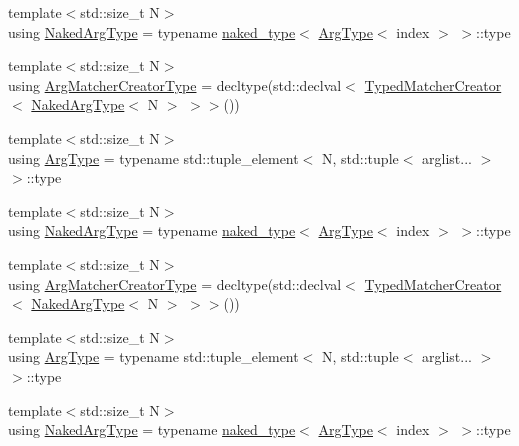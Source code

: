 \begin{DoxyCompactItemize}
\item 
{\footnotesize template$<$std\+::size\+\_\+t N$>$ }\\using \mbox{\hyperlink{classfakeit_1_1MatchersCollector_aeda8ced6a2f0cb7c6e4f916f18a91730}{Naked\+Arg\+Type}} = typename \mbox{\hyperlink{structfakeit_1_1naked__type}{naked\+\_\+type}}$<$ \mbox{\hyperlink{classfakeit_1_1MatchersCollector_aaba0fca8c182a698dda8ca056c29fe5f}{Arg\+Type}}$<$ index $>$ $>$\+::type
\item 
{\footnotesize template$<$std\+::size\+\_\+t N$>$ }\\using \mbox{\hyperlink{classfakeit_1_1MatchersCollector_a1b9d32a66882e0559e7072f1db88eee3}{Arg\+Matcher\+Creator\+Type}} = decltype(std\+::declval$<$ \mbox{\hyperlink{structfakeit_1_1TypedMatcherCreator}{Typed\+Matcher\+Creator}}$<$ \mbox{\hyperlink{classfakeit_1_1MatchersCollector_aeda8ced6a2f0cb7c6e4f916f18a91730}{Naked\+Arg\+Type}}$<$ N $>$ $>$$>$())
\item 
{\footnotesize template$<$std\+::size\+\_\+t N$>$ }\\using \mbox{\hyperlink{classfakeit_1_1MatchersCollector_aaba0fca8c182a698dda8ca056c29fe5f}{Arg\+Type}} = typename std\+::tuple\+\_\+element$<$ N, std\+::tuple$<$ arglist... $>$ $>$\+::type
\item 
{\footnotesize template$<$std\+::size\+\_\+t N$>$ }\\using \mbox{\hyperlink{classfakeit_1_1MatchersCollector_aeda8ced6a2f0cb7c6e4f916f18a91730}{Naked\+Arg\+Type}} = typename \mbox{\hyperlink{structfakeit_1_1naked__type}{naked\+\_\+type}}$<$ \mbox{\hyperlink{classfakeit_1_1MatchersCollector_aaba0fca8c182a698dda8ca056c29fe5f}{Arg\+Type}}$<$ index $>$ $>$\+::type
\item 
{\footnotesize template$<$std\+::size\+\_\+t N$>$ }\\using \mbox{\hyperlink{classfakeit_1_1MatchersCollector_a1b9d32a66882e0559e7072f1db88eee3}{Arg\+Matcher\+Creator\+Type}} = decltype(std\+::declval$<$ \mbox{\hyperlink{structfakeit_1_1TypedMatcherCreator}{Typed\+Matcher\+Creator}}$<$ \mbox{\hyperlink{classfakeit_1_1MatchersCollector_aeda8ced6a2f0cb7c6e4f916f18a91730}{Naked\+Arg\+Type}}$<$ N $>$ $>$$>$())
\item 
{\footnotesize template$<$std\+::size\+\_\+t N$>$ }\\using \mbox{\hyperlink{classfakeit_1_1MatchersCollector_aaba0fca8c182a698dda8ca056c29fe5f}{Arg\+Type}} = typename std\+::tuple\+\_\+element$<$ N, std\+::tuple$<$ arglist... $>$ $>$\+::type
\item 
{\footnotesize template$<$std\+::size\+\_\+t N$>$ }\\using \mbox{\hyperlink{classfakeit_1_1MatchersCollector_aeda8ced6a2f0cb7c6e4f916f18a91730}{Naked\+Arg\+Type}} = typename \mbox{\hyperlink{structfakeit_1_1naked__type}{naked\+\_\+type}}$<$ \mbox{\hyperlink{classfakeit_1_1MatchersCollector_aaba0fca8c182a698dda8ca056c29fe5f}{Arg\+Type}}$<$ index $>$ $>$\+::type

\end{DoxyCompactItemize}
